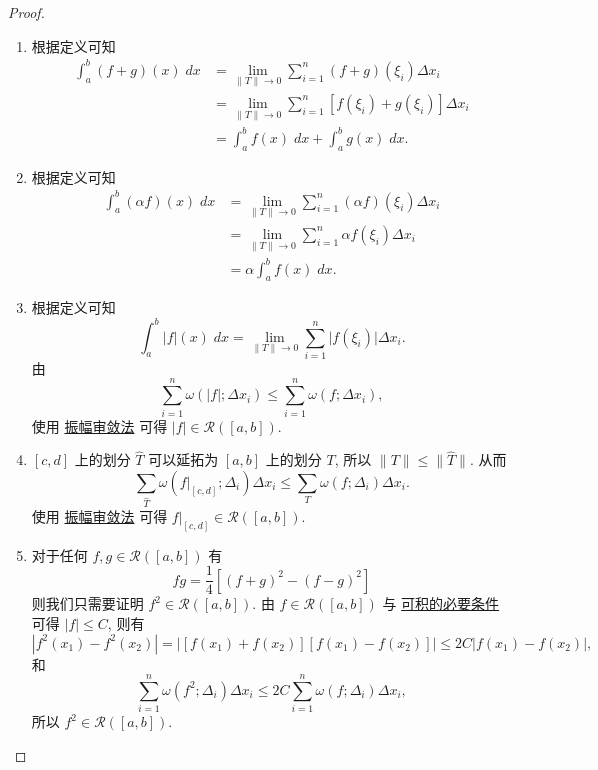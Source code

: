 \documentclass[cn,toc=twocol]{elegantbook}
\newcommand{\ITEMS}{\begin{enumerate}}
\newcommand{\ITEME}{\end{enumerate}}
\begin{document}
\begin{proof}
	\ITEMS
		\item 根据定义可知
		\[
		\begin{aligned}
			\int_a^b(f + g)(x)\;dx &= \lim_{\lVert T \rVert \to 0} \sum_{i=1}^n (f+g)(\xi_i) \Delta x_i\\
			&=  \lim_{\lVert T \rVert \to 0} \sum_{i=1}^n [f(\xi_i) + g(\xi_i)] \Delta x_i\\
			&=\int_a^b f(x)\;dx + \int_a^b g(x)\;dx.
		\end{aligned}
		\]
		
		\item 根据定义可知
		\[
		\begin{aligned}
			\int_a^b(\alpha f)(x)\;dx &= \lim_{\lVert T \rVert \to 0} \sum_{i=1}^n (\alpha f)(\xi_i) \Delta x_i\\
			&= \lim_{\lVert T \rVert \to 0} \sum_{i=1}^n \alpha f(\xi_i) \Delta x_i\\
			&= \alpha \int_a^b f(x)\;dx.
		\end{aligned}
		\]
		
		\item 根据定义可知
		\[
			\int_a^b \lvert f \rvert(x)\;dx = \lim_{\lVert T \rVert \to 0} \sum_{i=1}^n \lvert f (\xi_i) \rvert \Delta x_i.
		\]
		由
		\[
			\sum_{i = 1}^n \omega(\lvert f \rvert; \Delta x_i) \le \sum_{i = 1}^n \omega(f; \Delta x_i),
		\]
		使用 \hyperref[thm:darbouxct]{振幅审敛法} 可得 $\lvert f \rvert \in \mathscr{R}([a,b])$.
		
		\item $[c,d]$ 上的划分 $\hat T$ 可以延拓为 $[a,b]$ 上的划分 $T$, 所以 $\lVert T \rVert \le \lVert \hat T \rVert$. 从而
		\[
			\sum_{\hat T} \omega (f|_{[c,d]};\Delta_i) \Delta x_i \le \sum_{T} \omega (f;\Delta_i) \Delta x_i.
		\]
		使用 \hyperref[thm:darbouxct]{振幅审敛法} 可得 $f|_{[c,d]} \in \mathscr{R}([a,b])$.
		
		\item 对于任何 $f,g \in \mathscr{R}([a,b])$ 有
		\[
			fg = \frac{1}{4}\left[(f + g)^2 - (f - g)^2\right]
		\]
		则我们只需要证明 $f^2 \in \mathscr{R}([a,b])$. 由 $f \in \mathscr{R}([a,b])$ 与 \hyperref[thm:Intnc]{可积的必要条件} 可得 $\lvert f \rvert \le C$, 则有
		\[
			\left\lvert f^2(x_1) - f^2(x_2) \right\rvert = \bigl\lvert [f(x_1) + f(x_2)][f(x_1) - f(x_2)] \bigr\rvert \le 2C\lvert f(x_1) - f(x_2) \rvert,
		\]
		和
		\[
			\sum_{i=1}^n \omega(f^2;\Delta_i)\Delta x_i \le 2C \sum_{i=1}^n \omega(f;\Delta_i)\Delta x_i,
		\]
		所以 $f^2 \in \mathscr{R}([a,b])$.
	\ITEME
\end{proof}
\end{document}
